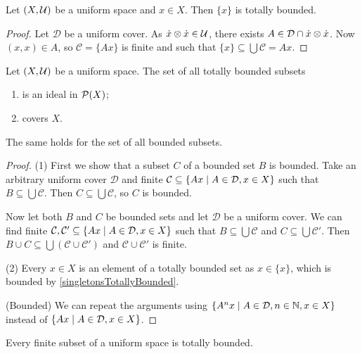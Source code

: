 \begin{lemma} \label{singletonsTotallyBounded}
Let $\sSet{X,\mathcal{U}}$ be a uniform space and $x\in X$. Then $\{x\}$ is totally bounded.
\end{lemma}
\begin{proof}
Let $\mathcal{D}$ be a uniform cover. As $\dot{x}\otimes \dot{x}\in \mathcal{U}$, there exists $A\in \mathcal{D} \cap \dot{x}\otimes \dot{x}$. Now $(x,x)\in A$, so $\mathcal{C} = \{Ax\}$ is finite and such that $\{x\} \subseteq \bigcup \mathcal{C} = Ax$.
\end{proof}

\begin{lemma} \label{boundedSetsIdeal}
Let $\sSet{X,\mathcal{U}}$ be a uniform space. The set of all totally bounded subsets
\begin{enumerate}
\item is an ideal in $\operatorname{\mathcal{P}}(X)$;
\item covers $X$.
\end{enumerate}
The same holds for the set of all bounded subsets.
\end{lemma}
\begin{proof}
(1) First we show that a subset $C$ of a bounded set $B$ is bounded. Take an arbitrary uniform cover $\mathcal{D}$ and finite $\mathcal{C}\subseteq \setbuilder{Ax}{A\in \mathcal{D}, x\in X}$ such that $B\subseteq \bigcup \mathcal{C}$. Then $C\subseteq \bigcup \mathcal{C}$, so $C$ is bounded.

Now let both $B$ and $C$ be bounded sets and let $\mathcal{D}$ be a uniform cover. We can find finite $\mathcal{C}, \mathcal{C}'\subseteq \setbuilder{Ax}{A\in \mathcal{D}, x\in X}$ such that $B\subseteq \bigcup \mathcal{C}$ and $C\subseteq \bigcup \mathcal{C}'$. Then $B\cup C \subseteq \bigcup (\mathcal{C}\cup \mathcal{C}')$ and $\mathcal{C}\cup \mathcal{C}'$ is finite.

(2) Every $x\in X$ is an element of a totally bounded set as $x\in \{x\}$, which is bounded by \ref{singletonsTotallyBounded}.

(Bounded) We can repeat the arguments using $\setbuilder{A^nx}{A\in \mathcal{D}, n\in\N, x\in X}$ instead of $\setbuilder{Ax}{A\in \mathcal{D}, x\in X}$.
\end{proof}
\begin{corollary}
Every finite subset of a uniform space is totally bounded.
\end{corollary}

